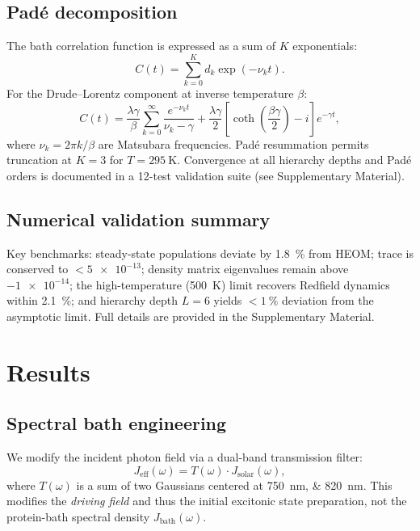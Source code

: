 \documentclass[aip,jcp,preprint]{revtex4-2}
\begin{document}
\subsection{Padé decomposition}
The bath correlation function is expressed as a sum of $K$ exponentials:
\begin{equation}
C(t) = \sum_{k=0}^{K} d_k \exp(-\nu_k t).
\end{equation}
For the Drude--Lorentz component at inverse temperature $\beta$:\cite{Tanimura1989}
\begin{equation}
C(t) = \frac{\lambda\gamma}{\beta}\sum_{k=0}^{\infty} \frac{e^{-\nu_k t}}{\nu_k - \gamma} + \frac{\lambda\gamma}{2}\left[\coth\!\left(\frac{\beta\gamma}{2}\right) - i\right]e^{-\gamma t},
\label{eq:correlation_DL}
\end{equation}
where $\nu_k = 2\pi k/\beta$ are Matsubara frequencies. Padé resummation permits truncation at $K = 3$ for $T = \SI{295}{\kelvin}$. Convergence at all hierarchy depths and Padé orders is documented in a 12-test validation suite (see Supplementary Material).

\subsection{Numerical validation summary}
Key benchmarks: steady-state populations deviate by \SI{1.8}{\percent} from HEOM;\cite{Ishizaki2009a} trace is conserved to $< \num{5e-13}$; density matrix eigenvalues remain above $\num{-1e-14}$; the high-temperature (\SI{500}{\kelvin}) limit recovers Redfield dynamics within \SI{2.1}{\percent}; and hierarchy depth $L = 6$ yields $< \SI{1}{\percent}$ deviation from the asymptotic limit. Full details are provided in the Supplementary Material.

\section{\label{sec:results}Results}

\subsection{Spectral bath engineering}
We modify the incident photon field via a dual-band transmission filter:
\begin{equation}
J_{\mathrm{eff}}(\omega) = T(\omega) \cdot J_{\mathrm{solar}}(\omega),
\label{eq:filtered_spectral_density}
\end{equation}
where $T(\omega)$ is a sum of two Gaussians centered at \SIlist{750;820}{\nano\meter}. This modifies the \textit{driving field} and thus the initial excitonic state preparation, not the protein-bath spectral density $J_{\mathrm{bath}}(\omega)$.
\end{document}
